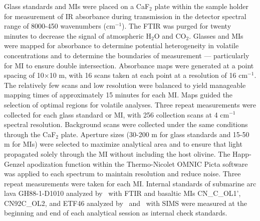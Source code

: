 \documentclass[draft]{agujournal2019}
\begin{document}
Glass standards and MIs were placed on a CaF$_2$ plate within the sample holder for measurement of IR absorbance during transmission in the detector spectral range of 8000-450 wavenumbers (cm$^{-1}$). The FTIR was purged for twenty minutes to decrease the signal of atmospheric H$_{2}$O and CO$_{2}$. Glasses and MIs were mapped for absorbance to determine potential heterogeneity in volatile concentrations and to determine the boundaries of measurement — particularly for MI to ensure double intersection. Absorbance maps were generated at a point spacing of 10$\times$10 \textmu m, with 16 scans taken at each point at a resolution of 16 cm$^{-1}$. The relatively few scans and low resolution were balanced to yield manageable mapping times of approximately 15 minutes for each MI. Maps guided the selection of optimal regions for volatile analyses. Three repeat measurements were collected for each glass standard or MI, with 256 collection scans at 4 cm$^{-1}$ spectral resolution. Background scans were collected under the same conditions through the CaF$_{2}$ plate. Aperture sizes (30-200 \textmu m for glass standards and 15-50 \textmu m for MIs) were selected to maximize analytical area and to ensure that light propagated solely through the MI without including the host olivine. The Happ-Genzel apodization function within the Thermo-Nicolet OMNIC Picta software was applied to each spectrum to maintain resolution and reduce noise. Three repeat measurements were taken for each MI. Internal standards of submarine arc lava GH88-1-D1010 analyzed by~ with FTIR and basaltic MIs CN\_C\_OL1’, CN92C\_OL2, and ETF46 analyzed by~ and~ with SIMS were measured at the beginning and end of each analytical session as internal check standards. 
\end{document}
